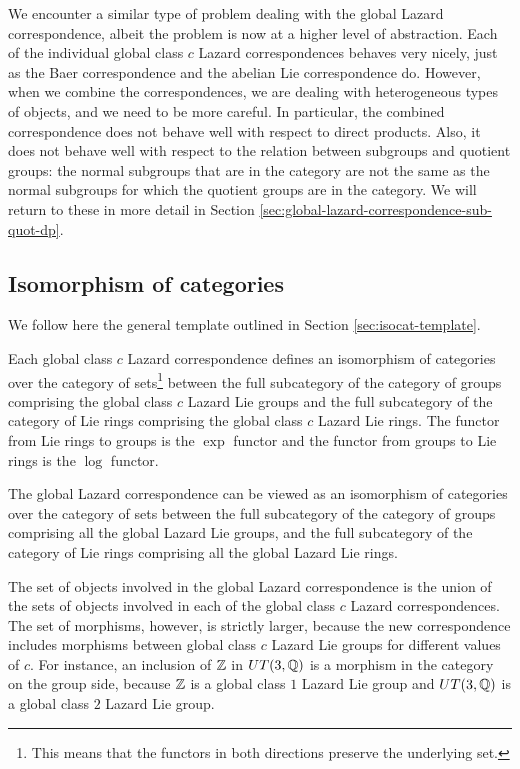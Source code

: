 We encounter a similar type of problem dealing with the global Lazard
correspondence, albeit the problem is now at a higher level of
abstraction. Each of the individual global class $c$ Lazard
correspondences behaves very nicely, just as the Baer correspondence
and the abelian Lie correspondence do. However, when we combine the
correspondences, we are dealing with heterogeneous types of objects,
and we need to be more careful. In particular, the combined
correspondence does not behave well with respect to direct
products. Also, it does not behave well with respect to the relation
between subgroups and quotient groups: the normal subgroups that are
in the category are not the same as the normal subgroups for which the
quotient groups are in the category. We will return to these in more
detail in Section \ref{sec:global-lazard-correspondence-sub-quot-dp}.

\subsection{Isomorphism of categories}

We follow here the general template outlined in Section
\ref{sec:isocat-template}.

Each global class $c$ Lazard correspondence defines an isomorphism of
categories over the category of sets\footnote{This means that the
  functors in both directions preserve the underlying set.} between the
full subcategory of the category of groups comprising the global
class $c$ Lazard Lie groups and the full subcategory of the category
of Lie rings comprising the global class $c$ Lazard Lie rings. The
functor from Lie rings to groups is the $\exp$ functor and the
functor from groups to Lie rings is the $\log$ functor.

The global Lazard correspondence can be viewed as an isomorphism of
categories over the category of sets between the full subcategory of
the category of groups comprising all the global Lazard Lie groups,
and the full subcategory of the category of Lie rings comprising all
the global Lazard Lie rings.

The set of objects involved in the global Lazard correspondence is the
union of the sets of objects involved in each of the global class $c$
Lazard correspondences. The set of morphisms, however, is strictly
larger, because the new correspondence includes morphisms between
global class $c$ Lazard Lie groups for different values of $c$. For
instance, an inclusion of $\mathbb{Z}$ in $UT(3,\mathbb{Q})$ is a morphism in the
category on the group side, because $\mathbb{Z}$ is a global class $1$ Lazard
Lie group and $UT(3,\mathbb{Q})$ is a global class $2$ Lazard Lie group.

